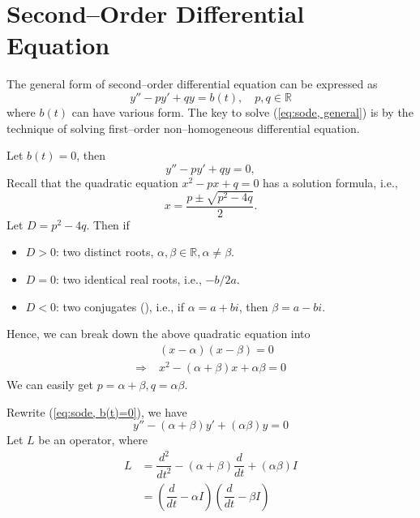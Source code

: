 \chapter{Second--Order Differential Equation}

The general form of second--order differential equation can be expressed as
\begin{equation}
	\label{eq:sode, general}
	y'' - py' + qy = b(t), \quad p, q \in \mathbb{R}
\end{equation}
where $b(t)$ can have various form. The key to solve (\ref{eq:sode, general}) is by the technique of solving first--order non--homogeneous differential equation.

Let $b(t) = 0$, then
\begin{equation}
	\label{eq:sode, b(t)=0}
	y'' - py' + qy = 0,
\end{equation}
Recall that the quadratic equation $x^{2} - px + q = 0$ has a solution formula, i.e.,
\[
	x = \dfrac{p \pm \sqrt{p^{2} - 4q}}{2}.
\]
Let $D = p^{2} - 4q$. Then if 
\begin{itemize}
	\item $D > 0$: two distinct roots, $\alpha, \beta \in \mathbb{R}, \alpha \neq \beta$.
	\item $D = 0$: two identical real roots, i.e., $-b/2a$.
	\item $D < 0$: two conjugates (), i.e., if $\alpha = a + bi$, then $\beta = a - bi$.
\end{itemize}
Hence, we can break down the above quadratic equation into
\[
	\begin{aligned}
		&(x - \alpha)(x - \beta) = 0\\
		\Rightarrow\;& x^{2} - (\alpha + \beta) x + \alpha \beta = 0
	\end{aligned}
\]
We can easily get $p = \alpha + \beta, q = \alpha \beta$.

Rewrite (\ref{eq:sode, b(t)=0}), we have
\[
	y'' - (\alpha + \beta)y' + (\alpha \beta) y = 0
\]
Let $L$ be an operator, where
\begin{align}
	L &= \dfrac{d^{2}}{dt^{2}} - (\alpha + \beta) \dfrac{d}{dt} + (\alpha \beta) I\\
	&= \left(\dfrac{d}{dt} - \alpha I\right) \left(\dfrac{d}{dt} - \beta I\right)
\end{align}

